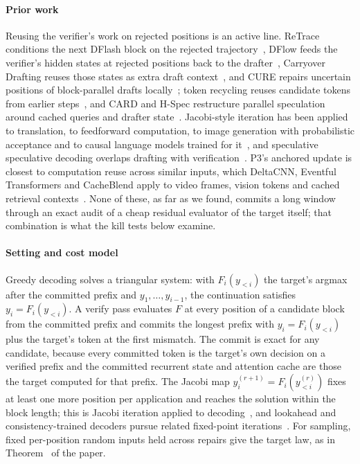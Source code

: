 \paragraph{Prior work} Reusing the verifier's work on rejected positions is an active line. ReTrace conditions the next DFlash block on the rejected trajectory~\cite{retrace2026}, DFlow feeds the verifier's hidden states at rejected positions back to the drafter~\cite{dflow}, Carryover Drafting reuses those states as extra draft context~\cite{carryover2026}, and CURE repairs uncertain positions of block-parallel drafts locally~\cite{cure2026}; token recycling reuses candidate tokens from earlier steps~\cite{tokenrecycling2024}, and CARD and H-Spec restructure parallel speculation around cached queries and drafter state~\cite{card2025,hspec2026}. Jacobi-style iteration has been applied to translation, to feedforward computation, to image generation with probabilistic acceptance and to causal language models trained for it~\cite{santilli2023jacobi,song2021parallel,sjd2025,so2026scd,hu2026jacobiforcing}, and speculative speculative decoding overlaps drafting with verification~\cite{specspec}. P3's anchored update is closest to computation reuse across similar inputs, which DeltaCNN, Eventful Transformers and CacheBlend apply to video frames, vision tokens and cached retrieval contexts~\cite{deltacnn2022,eventful2023,cacheblend2025}. None of these, as far as we found, commits a long window through an exact audit of a cheap residual evaluator of the target itself; that combination is what the kill tests below examine.

\paragraph{Setting and cost model}\label{sec:repair-model} Greedy decoding solves a triangular system: with $F_i(y_{<i})$ the target's argmax after the committed prefix and $y_1,\dots,y_{i-1}$, the continuation satisfies $y_i=F_i(y_{<i})$. A verify pass evaluates $F$ at every position of a candidate block from the committed prefix and commits the longest prefix with $y_i=F_i(y_{<i})$ plus the target's token at the first mismatch. The commit is exact for any candidate, because every committed token is the target's own decision on a verified prefix and the committed recurrent state and attention cache are those the target computed for that prefix. The Jacobi map $y^{(r+1)}_i=F_i(y^{(r)}_{<i})$ fixes at least one more position per application and reaches the solution within the block length; this is Jacobi iteration applied to decoding~\cite{song2021parallel,santilli2023jacobi}, and lookahead and consistency-trained decoders pursue related fixed-point iterations~\cite{lookahead,cllm}. For sampling, fixed per-position random inputs held across repairs give the target law, as in Theorem~ of the paper.

